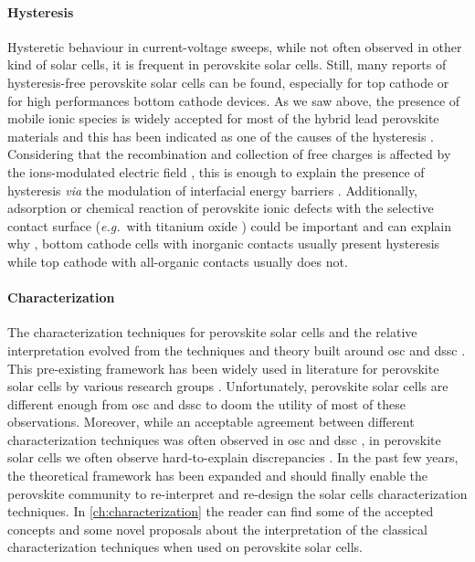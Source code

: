 	\paragraph{Hysteresis}
	Hysteretic behaviour in current-voltage sweeps, while not often observed in other kind of solar cells, it is frequent in perovskite solar cells.
	Still, many reports of hysteresis-free perovskite solar cells can be found, especially for top cathode or for high performances bottom cathode devices.
	As we saw above, the presence of mobile ionic species is widely accepted for most of the hybrid lead perovskite materials and this has been indicated as one of the causes of the hysteresis \cite{Unger2014,Xiao2015}.
	Considering that the recombination and collection of free charges is affected by the ions-modulated electric field \cite{Pockett2017}, this is enough to explain the presence of hysteresis \cite{Tress2015,Calado2016} \textsl{via} the modulation of interfacial energy barriers \cite{Moia2019}.
	Additionally, adsorption or chemical reaction of perovskite ionic defects with the selective contact surface (\textsl{e.g.}\ with titanium oxide \cite{Yu2016,Beilsten-Edmands2015,Carrillo2016}) could be important and can explain why \cite{Moia2019}, bottom cathode cells with inorganic contacts usually present hysteresis while top cathode with all-organic contacts usually does not.



	\paragraph{Characterization}
	The characterization techniques for perovskite solar cells and the relative interpretation evolved from the techniques and theory built around \gls{osc} and \gls{dssc} \cite{Barnes2013}.
	This pre-existing framework has been widely used in literature for perovskite solar cells by various research groups \cite{ORegan2015b,Shao2016,Gelmetti2019,Kiermasch2018,Carnie2015}.
	Unfortunately, perovskite solar cells are different enough from \gls{osc} and \gls{dssc} to doom the utility of most of these observations.
	Moreover, while an acceptable agreement between different characterization techniques was often observed in \gls{osc} \cite{Clarke2015,Maurano2011,Foertig2012} and \gls{dssc} \cite{Barnes2013}, in perovskite solar cells we often observe hard-to-explain discrepancies \cite{Kiermasch2018}.
	In the past few years, the theoretical framework has been expanded and should finally enable the perovskite community to re-interpret and re-design the solar cells characterization techniques.
	In \cref{ch:characterization} the reader can find some of the accepted concepts and some novel proposals about the interpretation of the classical characterization techniques when used on perovskite solar cells.

